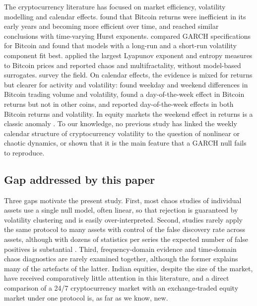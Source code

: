 \documentclass[11pt,a4paper]{article}
\begin{document}
The cryptocurrency literature has focused on market efficiency, volatility modelling and calendar effects.
\citet{Urquhart2016} found that Bitcoin returns were inefficient in its early years and becoming more efficient
over time, and \citet{Bariviera2017} reached similar conclusions with time-varying Hurst exponents.
\citet{Katsiampa2017} compared GARCH specifications for Bitcoin and found that models with a long-run and a
short-run volatility component fit best. \citet{LahmiriBekiros2018} applied the largest Lyapunov exponent and
entropy measures to Bitcoin prices and reported chaos and multifractality, without model-based surrogates.
\citet{Corbet2019} survey the field. On calendar effects, the evidence is mixed for returns but clearer for activity
and volatility: \citet{Baur2019} found weekday and weekend differences in Bitcoin trading volume and volatility,
\citet{Caporale2019} found a day-of-the-week effect in Bitcoin returns but not in other coins, and
\citet{AharonQadan2019} reported day-of-the-week effects in both Bitcoin returns and volatility. In equity markets the
weekend effect in returns is a classic anomaly \citep{French1980}. To our knowledge, no previous study has linked
the weekly calendar structure of cryptocurrency volatility to the question of nonlinear or chaotic dynamics, or
shown that it is the main feature that a GARCH null fails to reproduce.

\subsection{Gap addressed by this paper}

Three gaps motivate the present study. First, most chaos studies of individual assets use a single null model,
often linear, so that rejection is guaranteed by volatility clustering and is easily over-interpreted. Second,
studies rarely apply the same protocol to many assets with control of the false discovery rate across assets,
although with dozens of statistics per series the expected number of false positives is substantial
\citep{BenjaminiHochberg1995,Harvey2016}. Third, frequency-domain evidence and time-domain chaos diagnostics are
rarely examined together, although the former explains many of the artefacts of the latter. Indian equities, despite
the size of the market, have received comparatively little attention in this literature, and a direct comparison of
a 24/7 cryptocurrency market with an exchange-traded equity market under one protocol is, as far as we know, new.
\end{document}
